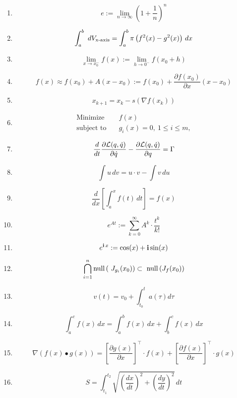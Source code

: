 \documentclass[letterpaper]{book}
\begin{document}
\begin{enumerate}
\Large
\itemsep4em %



\item $$
e := \lim_{n \to \infty } \left( 1 + \frac{1}{n} \right)^n
$$


\item $$
\int_a^b  dV_{\rm x{\text{-axis}}} = \int_a^b \pi \left( f^2(x) - g^2(x)\right)\,dx
$$

\item $$
\lim_{x \to x_0^-} f(x):=  \lim_{h \to 0^-} f(x_0+h)
$$

\item $$
f(x) \approx f(x_0) + A ( x - x_0) := f(x_0) + \frac{\partial f(x_0)}{\partial x} ( x - x_0)
$$



\item $$
x_{k+1}=x_k - s \left( \nabla f(x_k) \right)
$$

\item
\begin{align*}
\text{Minimize} \quad & f(x)\\
\text{subject to} \quad & g_i(x) = 0, ~ 1\le i \le m,
\end{align*}


\item $$
\frac{d}{dt} \frac{ \partial {\cal L}(q, \dot{q})}{\partial\dot{q}} - \frac{ \partial {\cal L}(q, \dot{q})}{\partial q} = \Gamma
$$

\item $$
\int u \, dv = u\cdot v - \int v \, du
$$

\item $$
\frac{d}{dx} \left[ \int_a^x f(t) \, dt \right] = f(x)
$$

\item $$
e^{A t}:=  \sum_{k=0}^\infty A^k \cdot \frac{t^k}{k!}
$$



\item $$
e^{\mathop{\bm{\mathrm i}} x}:= \cos(x) + \mathop{\bm{\mathrm i}} \sin(x)
$$


\item $$
\bigcap_{i=1}^n \nullspace\left(  J_{g_i}(x_0) \right) \subset   \nullspace\left( J_f(x_0) \right)
$$


\item $$
v(t) = v_0 +  \int_{t_0}^t a(\tau) d\tau
$$

\item $$
\int_{a}^{c} f(x)\, dx =\int_{a}^{b} f(x)\, dx + \int_{b}^{c} f(x)\, dx
$$

\item $$
\nabla \left( f(x) \bullet g(x) \right) = \left[ \frac{\partial g(x)}{\partial x} \right]^\top \cdot  f(x)  + 
\left[ \frac{\partial f(x)}{\partial x} \right]^\top \cdot g(x)
$$

\item $$
S = \int_{t_1}^{t_2} \sqrt{\left(\frac{dx}{dt}\right)^2 + \left(\frac{dy}{dt}\right)^2} \, dt
$$

\end{enumerate}
\end{document}
